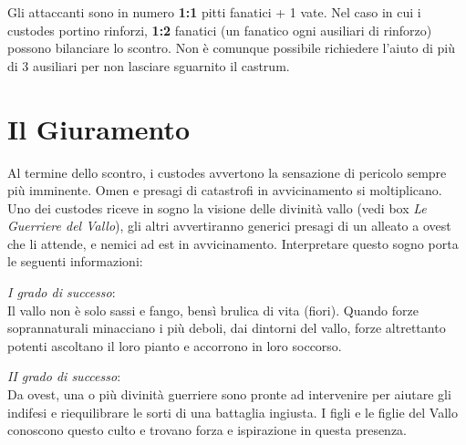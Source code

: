 \documentclass[11.5pt,twocolumn]{article}
\begin{document}
Gli attaccanti sono in numero \textbf{1:1} pitti fanatici + 1 vate.
Nel caso in cui i custodes portino rinforzi, \textbf{1:2} fanatici (un fanatico ogni ausiliari di rinforzo) possono bilanciare lo scontro.
Non \`{e} comunque possibile richiedere l'aiuto di pi\`{u} di 3 ausiliari per non lasciare sguarnito il castrum.

\section{Il Giuramento}
%
Al termine dello scontro, i custodes avvertono la sensazione di pericolo sempre pi\`{u} imminente.
Omen e presagi di catastrofi in avvicinamento si moltiplicano.
Uno dei custodes riceve in sogno la visione delle divinit\`{a} vallo (vedi box \emph{Le Guerriere del Vallo}), gli altri avvertiranno generici presagi di un alleato a ovest che li attende, e nemici ad est in avvicinamento.
%
Interpretare questo sogno porta le seguenti informazioni:

\emph{I grado di successo}:\\
Il vallo non \`{e} solo sassi e fango, bens\`{i} brulica di vita (fiori).
Quando forze soprannaturali minacciano i pi\`{u} deboli, dai dintorni del vallo, forze altrettanto potenti ascoltano il loro pianto e accorrono in loro soccorso.

\emph{II grado di successo}:\\
Da ovest, una o pi\`{u} divinit\`{a} guerriere sono pronte ad intervenire per aiutare gli indifesi e riequilibrare le sorti di una battaglia ingiusta.
I figli e le figlie del Vallo conoscono questo culto e trovano forza e ispirazione in questa presenza.
\end{document}
